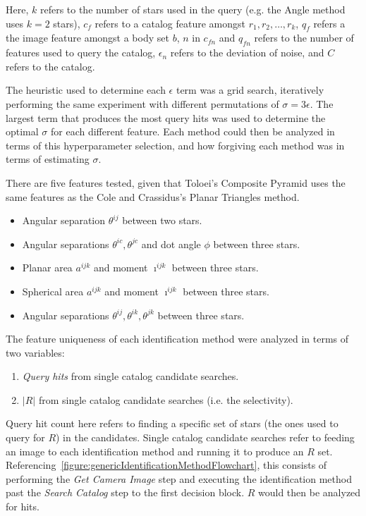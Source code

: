 Here, $k$ refers to the number of stars used in the query (e.g. the Angle method uses $k = 2$ stars), $c_f$ refers to
a catalog feature amongst $r_1, r_2, \ldots, r_k$, $q_f$ refers a the image feature amongst a body set $b$, $n$ in
$c_{fn}$ and $q_{fn}$ refers to the number of features used to query the catalog, $\epsilon_n$ refers to the deviation
of noise, and $C$ refers to the catalog.

The heuristic used to determine each $\epsilon$ term was a grid search, iteratively performing the same experiment with
different permutations of $\sigma = 3\epsilon$.
The largest term that produces the most query hits was used to determine the optimal $\sigma$ for each different
feature.
Each method could then be analyzed in terms of this hyperparameter selection, and how forgiving each method was in terms
of estimating $\sigma$.

There are five features tested, given that Toloei's Composite Pyramid uses the same features as the Cole and
Crassidus's Planar Triangles method.
\begin{itemize}
    \item Angular separation $\theta^{ij}$ between two stars.
    \item Angular separations $\theta^{ic}, \theta^{jc}$ and dot angle $\phi$ between three stars.
    \item Planar area $a^{ijk}$ and moment $\imath^{ijk}$ between three stars.
    \item Spherical area $a^{ijk}$ and moment $\imath^{ijk}$ between three stars.
    \item Angular separations $\theta^{ij}, \theta^{ik}, \theta^{jk}$ between three stars.
\end{itemize}

The feature uniqueness of each identification method were analyzed in terms of two variables:
\begin{enumerate}
    \item \label{itm:hitCountFeature} \textit{Query hits} from single catalog candidate searches.
    \item $|R|$ from single catalog candidate searches (i.e. the selectivity).
\end{enumerate}

Query hit count here refers to finding a specific set of stars (the ones used to query for $R$) in the candidates.
Single catalog candidate searches refer to feeding an image to each identification method and running it to produce
an $R$ set.
Referencing~\autoref{figure:genericIdentificationMethodFlowchart}, this consists of performing the \textit{Get Camera
Image} step and executing the identification method past the \textit{Search Catalog} step to the first decision
block.
$R$ would then be analyzed for hits.

